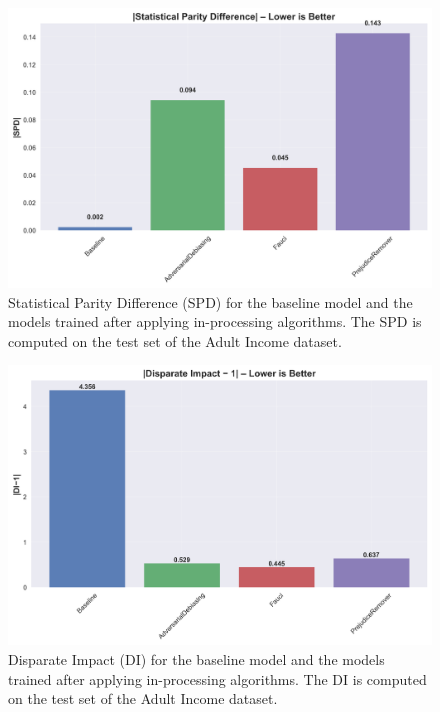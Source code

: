 \documentclass[12pt,a4paper,openright,twoside]{book}
\begin{document}
\begin{figure}
    \centering
    \includegraphics[width=\textwidth]{figures/inprocessing_results/inprocessing_spd_comparison.png}
    \caption{Statistical Parity Difference (SPD) for the baseline model and the models trained after applying in-processing algorithms. The SPD is computed on the test set of the Adult Income dataset.}
    \label{fig:inprocessing_results}
\end{figure}

\begin{figure}
    \centering
    \includegraphics[width=\textwidth]{figures/inprocessing_results/inprocessing_di_comparison.png}
    \caption{Disparate Impact (DI) for the baseline model and the models trained after applying in-processing algorithms. The DI is computed on the test set of the Adult Income dataset.}
    \label{fig:inprocessing_results_di}
\end{figure}
\end{document}
